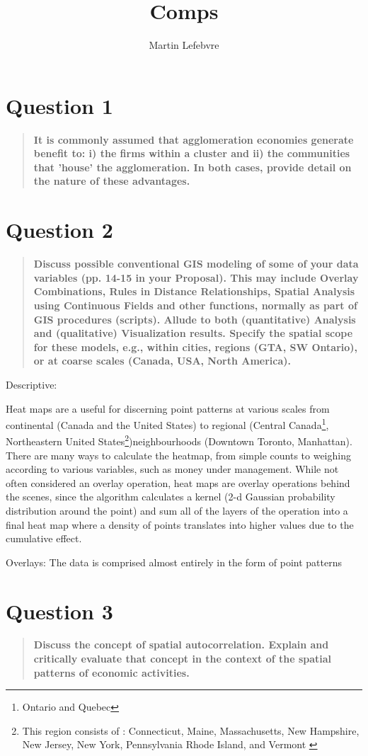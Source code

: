 \documentclass[12pt,letterpaper,notitlepage,onecolumn,final,openbib]{article}
\author{Martin Lefebvre}
\title{Comps}
\begin{document}
	
\section{Question 1}
\begin{quotation}
\textbf{It is commonly assumed that agglomeration economies generate benefit to: i) the firms within a cluster and ii) the communities that 'house' the agglomeration. In both cases, provide detail on the nature of these advantages.}
\end{quotation}
\section{Question 2}
\begin{quotation}
\textbf{Discuss possible conventional GIS modeling of some of your data variables (pp. 14-15 in your Proposal). This may include Overlay Combinations, Rules in Distance Relationships, Spatial Analysis using Continuous Fields and other functions, normally as part of GIS procedures (scripts). Allude to both (quantitative) Analysis and (qualitative) Visualization results. Specify the spatial scope for these models, e.g., within cities, regions (GTA, SW Ontario), or at coarse scales (Canada, USA, North America).}
\end{quotation}

Descriptive:

Heat maps are a useful for discerning point patterns at various scales from continental (Canada and the United States) to regional (Central Canada\footnote{Ontario and Quebec}, Northeastern United States\footnote{This region consists of : Connecticut, Maine, Massachusetts, New Hampshire, New Jersey, New York, Pennsylvania Rhode Island, and Vermont \cite{Census2010_div}})neighbourhoods (Downtown Toronto, Manhattan).  There are many ways to calculate the heatmap, from simple counts to weighing according to various variables, such as money under management.   While not often considered an overlay operation, heat maps are overlay operations behind the scenes, since the algorithm calculates a kernel (2-d Gaussian probability distribution around the point) and sum all of the layers of the operation into a final heat map where a density of points translates into higher values due to the cumulative effect.  

Overlays:
The data is comprised almost entirely in the form of point patterns 



\section{Question 3}
\begin{quotation}
\textbf{Discuss the concept of spatial autocorrelation. Explain and critically evaluate that concept in the context of the spatial patterns of economic activities.}
\end{quotation}
\end{document}
